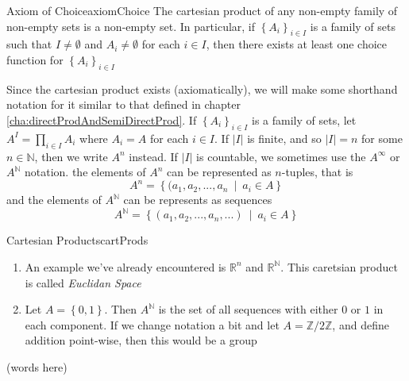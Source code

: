 \documentclass[oneside]{book}
\newcommand{\N}{\mathbb{N}}
\newcommand{\R}{\mathbb{R}}
\newcommand{\Z}{\mathbb{Z}}
\newcommand{\set}[2]{\left\{#1 \ \middle|\ #2\right\}}
\begin{document}
\begin{axiom}{Axiom of Choice}{axiomChoice}
	The cartesian product of any non-empty family of non-empty sets is a non-empty set. In particular, if $\left\{ A_i
	\right\}_{i \in I}$ is a family of sets such that $I \ne \emptyset$ and $A_i \ne \emptyset$ for each $i \in I$, then
	there exists at least one choice function for $\left\{ A_i \right\}_{i \in I}$
\end{axiom}

Since the cartesian product exists (axiomatically), we will make some shorthand notation for it similar to that defined
in chapter \ref{cha:directProdAndSemiDirectProd}. If $\left\{ A_i \right\}_{i \in I}$ is a family of sets, let $A^I
= \prod_{i \in I} A_i$ where $A_i = A$ for each $i \in I$. If $|I|$ is finite, and so $|I| = n$ for some $n \in \N$,
then we write $A^n$ instead. If $|I|$ is countable, we sometimes use the $A^\infty$ or $A^\N$ notation. the elements of
$A^n$ can be represented as $n$-tuples, that is
\[
	A^n = \set{( a_1, a_2, ..., a_n}{a_i \in A}
\]
and the elements of $A^\N$ can be represents as sequences
\[
A^\N = \set{ (a_1, a_2, ..., a_n, ...)}{a_i \in A}
\]

\begin{example}{Cartesian Products}{cartProds}
	\begin{enumerate}
		\item An example we've already encountered is $\R^n$ and $\R^\N$. This caretsian product is called
			\emph{Euclidan Space}
		\item Let $A = \left\{ 0,1 \right\}$. Then $A^\N$ is the set of all sequences with either $0$ or $1$ in each
			component. If we change notation a bit and let $A = \Z/2\Z$, and define addition point-wise, then this would
			be a group
	\end{enumerate}
\end{example}

(words here)
\end{document}
